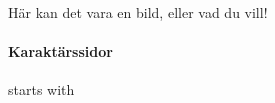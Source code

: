 \documentclass{laspex}
\begin{document}
\begin{framsida}
Här kan det vara en bild, eller vad du vill!
\end{framsida}

\begin{karaktarsida}
\paragraph{Karaktärssidor} starts with
\end{karaktarsida}

\end{document}

